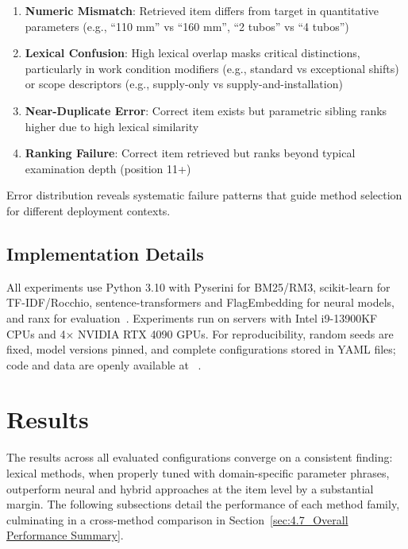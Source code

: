 \documentclass[preprint,12pt]{elsarticle}
\begin{document}
\begin{enumerate}
    \item \textbf{Numeric Mismatch}: Retrieved item differs from target in quantitative parameters (e.g., ``110 mm'' vs ``160 mm'', ``2 tubos'' vs ``4 tubos'')
    
    \item \textbf{Lexical Confusion}: High lexical overlap masks critical distinctions, particularly in work condition modifiers (e.g., standard vs exceptional shifts) or scope descriptors (e.g., supply-only vs supply-and-installation)
    
    \item \textbf{Near-Duplicate Error}: Correct item exists but parametric sibling ranks higher due to high lexical similarity
    
    \item \textbf{Ranking Failure}: Correct item retrieved but ranks beyond typical examination depth (position 11+)
\end{enumerate}

Error distribution reveals systematic failure patterns that guide method selection for different deployment contexts.

\subsection{Implementation Details}

All experiments use Python 3.10 with Pyserini for BM25/RM3, scikit-learn for TF-IDF/Rocchio, sentence-transformers and FlagEmbedding for neural models, and ranx for evaluation~\citep{bassani2022ranx}. Experiments run on servers with Intel i9-13900KF CPUs and 4× NVIDIA RTX 4090 GPUs. For reproducibility, random seeds are fixed, model versions pinned, and complete configurations stored in YAML files; code and data are openly available at ~\cite{bc3cat_software,bc3cat_dataset}. 

\section{Results}
The results across all evaluated configurations converge on a consistent finding: lexical methods, when properly tuned with domain-specific parameter phrases, outperform neural and hybrid approaches at the item level by a substantial margin. The following subsections detail the performance of each method family, culminating in a cross-method comparison in Section~\ref{sec:4.7_Overall Performance Summary}.
\end{document}
